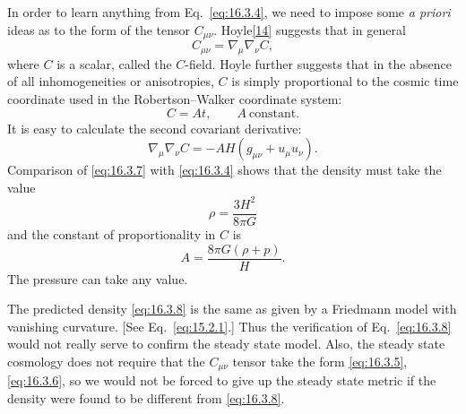 In order to learn anything from Eq.~\eqref{eq:16.3.4}, we need to impose some
\emph{a priori} ideas as to the form of the tensor \(C_{\mu\nu}\).
Hoyle\hyperref[ch16-ref-14]{[14]} suggests that in general
\begin{equation}
  C_{\mu\nu}=\nabla_\mu\nabla_\nu C,
  \tag{16.3.5}\label{eq:16.3.5}
\end{equation}
where \(C\) is a scalar, called the \(C\)-field. Hoyle further suggests that in
the absence of all inhomogeneities or anisotropies, \(C\) is simply
proportional to the cosmic time coordinate used in the Robertson--Walker
coordinate system:
\begin{equation}
  C=At,
  \qquad
  A\ \text{constant}.
  \tag{16.3.6}\label{eq:16.3.6}
\end{equation}
It is easy to calculate the second covariant derivative:
\begin{equation}
  \nabla_\mu\nabla_\nu C
  =
  -AH(g_{\mu\nu}+u_\mu u_\nu).
  \tag{16.3.7}\label{eq:16.3.7}
\end{equation}
Comparison of \eqref{eq:16.3.7} with \eqref{eq:16.3.4} shows that the density
must take the value
\begin{equation}
  \rho=\frac{3H^2}{8\pi G}
  \tag{16.3.8}\label{eq:16.3.8}
\end{equation}
and the constant of proportionality in \(C\) is
\begin{equation}
  A=\frac{8\pi G(\rho+p)}{H}.
  \tag{16.3.9}\label{eq:16.3.9}
\end{equation}
The pressure can take any value.

The predicted density \eqref{eq:16.3.8} is the same as given by a Friedmann
model with vanishing curvature. [See Eq.~\eqref{eq:15.2.1}.] Thus the
verification of Eq.~\eqref{eq:16.3.8} would not really serve to confirm the
steady state model. Also, the steady state cosmology does not require that the
\(C_{\mu\nu}\) tensor take the form \eqref{eq:16.3.5}, \eqref{eq:16.3.6}, so we
would not be forced to give up the steady state metric if the density were
found to be different from \eqref{eq:16.3.8}.

